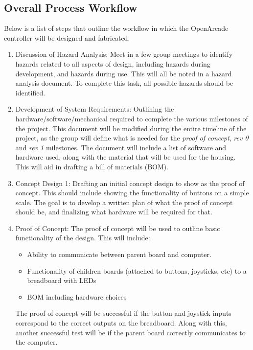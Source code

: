 \documentclass[a4]{article}
\begin{document}
\subsection{Overall Process Workflow}
Below is a list of steps that outline the workflow in which the OpenArcade controller will be designed and fabricated.
\begin{enumerate}
	\item \textcolor{McMasterMaroon}{Discussion of Hazard Analysis}: Meet in a few group meetings to identify hazards related to all aspects of design, including hazards during development, and hazards during use. This will all be noted in a hazard analysis document. To complete this task, all possible hazards should be identified.
	\item \textcolor{McMasterMaroon}{Development of System Requirements}: Outlining the hardware/software/mechanical required to complete the various milestones of the project. This document will be modified during the entire timeline of the project, as the group will define what is needed for the \textit{proof of concept}, \textit{rev 0} and \textit{rev 1} milestones. The document will include a list of software and hardware used, along with the material that will be used for the housing. This will aid in drafting a bill of materials (BOM).
	\item \textcolor{McMasterMaroon}{Concept Design 1}: Drafting an initial concept design to show as the proof of concept. This should include showing the functionality of buttons on a simple scale. The goal is to develop a written plan of what the proof of concept should be, and finalizing what hardware will be required for that.
	\item \textcolor{McMasterMaroon}{Proof of Concept}: The proof of concept will be used to outline basic functionality of the design. This will include:
	      \begin{itemize}
		      \item Ability to communicate between parent board and computer.
		      \item Functionality of children boards (attached to buttons, joysticks, etc) to a breadboard with LEDs
		      \item BOM including hardware choices
	      \end{itemize}
	      The proof of concept will be successful if the button and joystick inputs correspond to the correct outputs on the breadboard. Along with this, another successful test will be if the parent board correctly communicates to the computer.

\end{enumerate}
\end{document}
